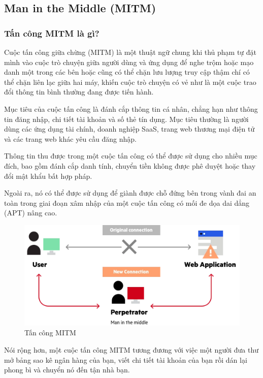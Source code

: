 \subsection{Man in the Middle (MITM)}

\subsubsection{Tấn công MITM là gì?}
    Cuộc tấn công giữa chừng (MITM) là một thuật ngữ chung khi thủ phạm tự đặt mình vào cuộc trò chuyện giữa người dùng và ứng dụng để nghe trộm hoặc mạo danh một trong các bên hoặc cũng có thể chặn lưu lượng truy cập thậm chí có thể chặn liên lạc giữa hai máy, khiến cuộc trò chuyện có vẻ như là một cuộc trao đổi thông tin bình thường đang được tiến hành.
    
Mục tiêu của cuộc tấn công là đánh cắp thông tin cá nhân, chẳng hạn như thông tin đăng nhập, chi tiết tài khoản và số thẻ tín dụng. Mục tiêu thường là người dùng các ứng dụng tài chính, doanh nghiệp SaaS, trang web thương mại điện tử và các trang web khác yêu cầu đăng nhập.

Thông tin thu được trong một cuộc tấn công có thể được sử dụng cho nhiều mục đích, bao gồm đánh cắp danh tính, chuyển tiền không được phê duyệt hoặc thay đổi mật khẩu bất hợp pháp.

Ngoài ra, nó có thể được sử dụng để giành được chỗ đứng bên trong vành đai an toàn trong giai đoạn xâm nhập của một  cuộc tấn công có mối đe dọa dai dẳng  (APT) nâng cao.
\begin{figure}[H]
    \centering
    \includegraphics[scale=0.7]{pic/huê/mitm.png}
    
    \caption{Tấn công MITM}
\end{figure}
Nói rộng hơn, một cuộc tấn công MITM tương đương với việc một người đưa thư mở bảng sao kê ngân hàng của bạn, viết chi tiết tài khoản của bạn rồi dán lại phong bì và chuyển nó đến tận nhà bạn.
